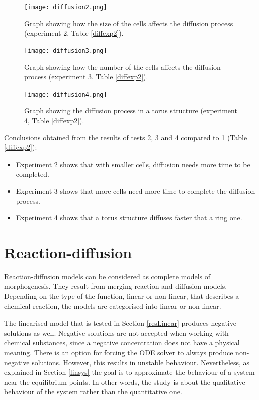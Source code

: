 \begin{figure}
\centering
\texttt{[image: diffusion2.png]}
\caption{Graph showing how the size of the cells affects the diffusion process (experiment 2, Table \ref{diffexp2}).}
\label{d2}
\end{figure}

\begin{figure}
\centering
\texttt{[image: diffusion3.png]}
\caption{Graph showing how the number of the cells affects the diffusion process (experiment 3, Table \ref{diffexp2}).}
\label{d3}
\end{figure}

\begin{figure}
\centering
\texttt{[image: diffusion4.png]}
\caption{Graph showing the diffusion process in a torus structure (experiment 4, Table \ref{diffexp2}).}
\label{d4}
\end{figure}

Conclusions obtained from the results of tests 2, 3 and 4 compared to 1 (Table \ref{diffexp2}):
\begin{itemize}
\item Experiment 2 shows that with smaller cells, diffusion needs more time to be completed.
\item Experiment 3 shows that more cells need more time to complete the diffusion process.
\item Experiment 4 shows that a torus structure diffuses faster that a ring one.     
\end{itemize}
		
\section{Reaction-diffusion}
    Reaction-diffusion models can be considered as complete models of morphogenesis. They result from merging reaction and diffusion models. Depending on the type of the function, linear or non-linear, that describes a chemical reaction, the models are categorised into linear or non-linear.
    
The linearised model that is tested in Section \ref{resLinear} produces negative solutions as well. Negative solutions are not accepted when working with chemical substances, since a negative concentration does not have a physical meaning. There is an option for forcing the ODE solver to always produce non-negative solutions. However, this results in unstable behaviour. Nevertheless, as explained in Section \ref{linsys} the goal is to approximate the behaviour of a system near the equilibrium points. In other words, the study is about the qualitative behaviour of the system rather than the quantitative one.

